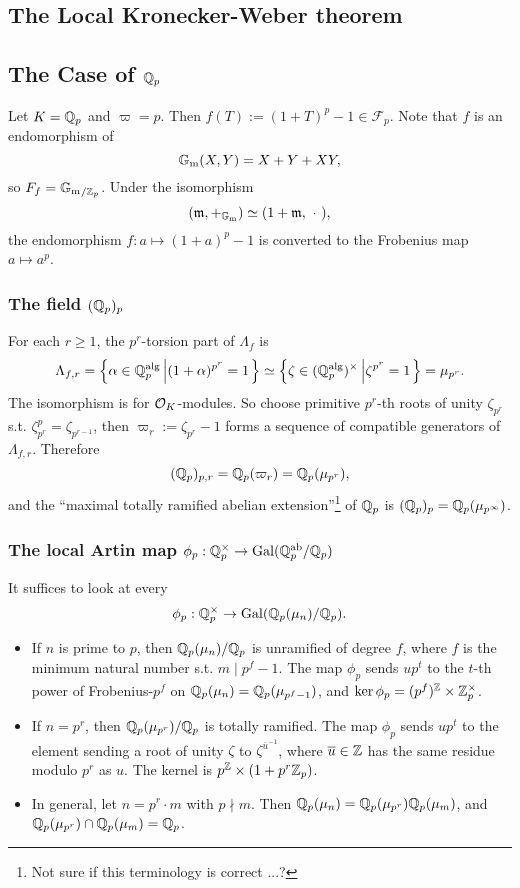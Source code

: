 \subsection{The Local Kronecker-Weber theorem}

\subsection{The Case of \texorpdfstring{$\mathbb{Q}_p$}{}}
Let $K = \mathbb{Q}_p$ and $\varpi = p$. Then $f(T) := (1 + T)^p - 1\in\mathcal{F}_p$.
Note that $f$ is an endomorphism of \[\mathbb{G}_{\mathrm{m}}(X, Y) = X + Y + XY,\] so $F_f = \mathbb{G}_{\mathrm{m}}{}_{/\mathbb{Z}_p}$. Under the isomorphism
\[(\mathfrak{m}, +_{\mathbb{G}_{\mathrm{m}}})\simeq (1 + \mathfrak{m},\ \cdot\ ),\]
the endomorphism $f : a\mapsto (1 + a)^p - 1$ is converted to the Frobenius map $a\mapsto a^p$.

\subsubsection*{The field $(\mathbb{Q}_p)_p$}

For each $r\ge 1$, the $p^r$-torsion part of $\Lambda_f$ is
\[\Lambda_{f, r} = \left\{\alpha\in\mathbb{Q}_p^{\mathrm{alg}}\left|(1 + \alpha)^{p^r} = 1\right.\right\}\simeq
\left\{\zeta\in(\mathbb{Q}_p^{\mathrm{alg}})^{\times}
\left|\zeta^{p^r} = 1\right.\right\} = \mu_{p^r}.\]
The isomorphism is for $\mathcal{O}_K$-modules.
So choose primitive $p^r$-th roots of unity $\zeta_{p^r}$ s.t. $\zeta_{p^r}^p = \zeta_{p^{r-1}}$,
then $\varpi_r := \zeta_{p^r} - 1$ forms a sequence of compatible generators of $\Lambda_{f, r}$.
Therefore \[(\mathbb{Q}_p)_{p, r} = \mathbb{Q}_p(\varpi_r) = \mathbb{Q}_p(\mu_{p^r}),\]
and the ``maximal totally ramified abelian extension''\footnote{Not sure if this terminology is correct ...?} of $\mathbb{Q}_p$ is $(\mathbb{Q}_p)_p = \mathbb{Q}_p(\mu_{p^\infty})$.

\subsubsection*{The local Artin map \texorpdfstring{$\phi_p : \mathbb{Q}_p^\times\to \operatorname{Gal}(\mathbb{Q}_p^{\mathrm{ab}}/\mathbb{Q}_p)$}{}}

It suffices to look at every \[\phi_p : \mathbb{Q}_p^\times\to \operatorname{Gal}(\mathbb{Q}_p(\mu_n)/\mathbb{Q}_p).\]
\begin{itemize}
    \item If $n$ is prime to $p$, then $\mathbb{Q}_p(\mu_n)/\mathbb{Q}_p$ is unramified of degree $f$, where $f$ is the minimum natural number s.t. $m\mid p^f - 1$.
    The map $\phi_p$ sends $up^t$ to the $t$-th power of Frobenius-$p^f$ on $\mathbb{Q}_p(\mu_n) = \mathbb{Q}_p(\mu_{p^f - 1})$, and $\ker\phi_p = (p^{f})^{\mathbb{Z}}\times\mathbb{Z}_p^\times$.
    \item If $n = p^r$, then $\mathbb{Q}_p(\mu_{p^r})/\mathbb{Q}_p$ is totally ramified. The map $\phi_p$ sends $up^t$ to the element sending a root of unity $\zeta$ to $\zeta^{\bar u^{-1}}$, where $\overline u\in\mathbb{Z}$ has the same residue modulo $p^r$ as $u$.
    The kernel is $p^{\mathbb{Z}}\times (1 + p^r\mathbb{Z}_p)$.
    \item In general, let $n = p^r\cdot m$ with $p\nmid m$. Then $\mathbb{Q}_p(\mu_n) = \mathbb{Q}_p(\mu_{p^r})\mathbb{Q}_p(\mu_m)$, and $\mathbb{Q}_p(\mu_{p^r})\cap\mathbb{Q}_p(\mu_m) = \mathbb{Q}_p$.
\end{itemize}



